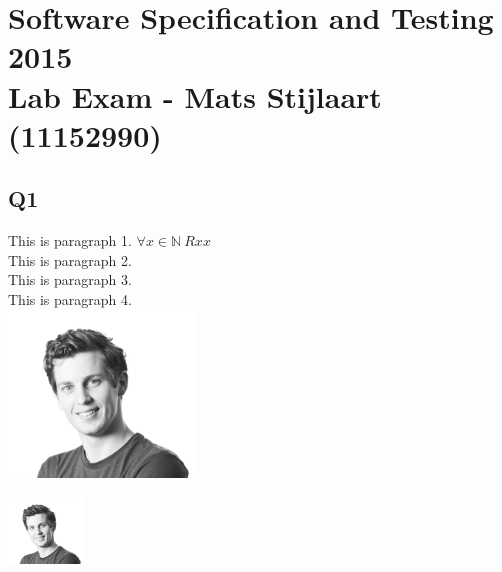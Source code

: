 \section*{Software Specification and Testing 2015 \\ Lab Exam - Mats Stijlaart (11152990)}

\subsection*{Q1}

This is paragraph 1. $\forall x \in \mathbb{N}\ Rxx$\\

\noindent
This is paragraph 2. \\

\noindent
This is paragraph 3. \\

\noindent
This is paragraph 4. \\

\includegraphics[width=5cm]{./img/avatar_new}

\includegraphics[width=2cm]{./img/avatar_new}
